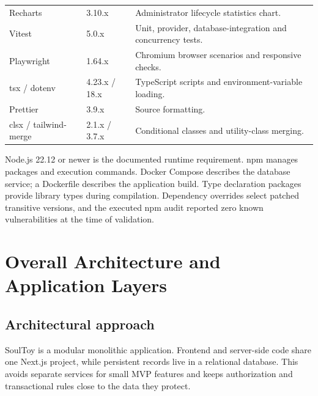\documentclass[11pt,a4paper]{article}
\begin{document}
\begin{longtable}{p{3.5cm}p{2.1cm}p{8.1cm}}
Recharts & 3.10.x & Administrator lifecycle statistics chart.\\
Vitest & 5.0.x & Unit, provider, database-integration and concurrency tests.\\
Playwright & 1.64.x & Chromium browser scenarios and responsive checks.\\
tsx / dotenv & 4.23.x / 18.x & TypeScript scripts and environment-variable loading.\\
Prettier & 3.9.x & Source formatting.\\
clsx / tailwind-merge & 2.1.x / 3.7.x & Conditional classes and utility-class merging.\\
\bottomrule
\end{longtable}

Node.js 22.12 or newer is the documented runtime requirement. npm manages packages and execution commands. Docker Compose describes the database service; a Dockerfile describes the application build. Type declaration packages provide library types during compilation. Dependency overrides select patched transitive versions, and the executed npm audit reported zero known vulnerabilities at the time of validation.

\section{Overall Architecture and Application Layers}

\subsection{Architectural approach}
SoulToy is a modular monolithic application. Frontend and server-side code share one Next.js project, while persistent records live in a relational database. This avoids separate services for small MVP features and keeps authorization and transactional rules close to the data they protect.
\end{document}
